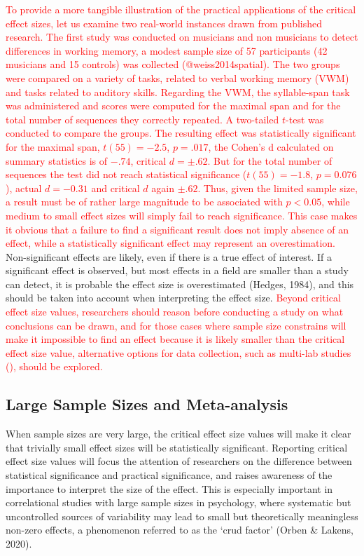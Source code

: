 \documentclass[
  man]{apa7}
\begin{document}
\textcolor{red}{To provide a more tangible illustration of the practical applications of the critical effect sizes, let us examine two real-world instances drawn from published research. The first study was conducted on musicians and non musicians to detect differences in working memory, a modest sample size of 57 participants (42 musicians and 15 controls) was collected (@weiss2014spatial). The two groups were compared on a variety of tasks, related to verbal working memory (VWM) and tasks related to auditory skills. Regarding the VWM, the syllable-span task was administered and scores were computed for the maximal span and for the total number of sequences they correctly repeated. A two-tailed $t$-test was conducted to compare the groups. The resulting effect was statistically significant for the maximal span, $t(55) = -2.5$, $p = .017$, the Cohen's d calculated on summary statistics is of $-.74$, critical $d = \pm .62$. But for the total number of sequences the test did not reach statistical significance ($t(55) = -1.8$, $p = 0.076$), actual $d = -0.31$ and critical $d$ again $\pm.62$. Thus, given the limited sample size, a result must be of rather large magnitude to be associated with $p < 0.05$, while medium to small effect sizes will simply fail to reach significance. This case makes it obvious that a failure to find a significant result does not imply absence of an effect, while a statistically significant effect may represent an overestimation. } Non-significant effects are likely, even if there is a true effect of interest. If a significant effect is observed, but most effects in a field are smaller than a study can detect, it is probable the effect size is overestimated (Hedges, 1984), and this should be taken into account when interpreting the effect size.
\textcolor{red}{Beyond critical effect size values, researchers should reason before conducting a study on what conclusions can be drawn, and for those cases where sample size constrains will make it impossible to find an effect because it is likely smaller than the critical effect size value, alternative options for data collection, such as multi-lab studies (\cite{AAA}), should be explored.}

\hypertarget{large-sample-sizes-and-meta-analysis}{%
\subsection{Large Sample Sizes and Meta-analysis}\label{large-sample-sizes-and-meta-analysis}}

When sample sizes are very large, the critical effect size values will make it clear that trivially small effect sizes will be statistically significant. Reporting critical effect size values will focus the attention of researchers on the difference between statistical significance and practical significance, and raises awareness of the importance to interpret the size of the effect. This is especially important in correlational studies with large sample sizes in psychology, where systematic but uncontrolled sources of variability may lead to small but theoretically meaningless non-zero effects, a phenomenon referred to as the `crud factor' (Orben \& Lakens, 2020).
\end{document}
